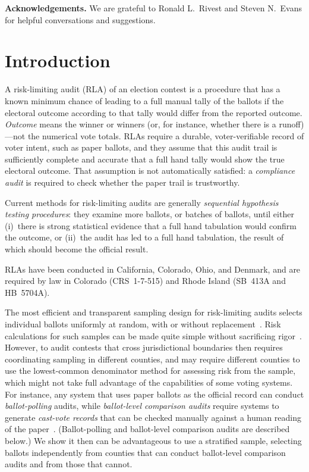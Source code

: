 \documentclass[runningheads]{llncs}
\begin{document}
\noindent
\textbf{Acknowledgements.}
We are grateful to Ronald L.~Rivest and Steven N.~Evans for helpful conversations and suggestions.

\section{Introduction}
A risk-limiting audit (RLA) of an election contest is a procedure that
has a known minimum chance of leading to a full manual tally of the ballots if the electoral outcome  according to that tally would differ from the reported outcome.
\emph{Outcome} means the winner or winners (or, for instance, whether there is a runoff)---not the numerical vote totals. 
RLAs require a durable, voter-verifiable record of voter intent, such as paper ballots,
and they assume that this audit trail is sufficiently complete and accurate that a full hand
tally would show the true electoral outcome.
That assumption is not automatically satisfied: a \emph{compliance audit}
\cite{starkWagner12} 
is required to check whether the paper trail is trustworthy.

Current methods for risk-limiting audits are generally \emph{sequential hypothesis testing procedures}: they examine more ballots, or batches of ballots,
until either (i)~there is strong statistical evidence that a full hand tabulation would confirm the outcome,
or (ii)~the audit has led to a full hand tabulation, the result of which should become the official
result.

RLAs have been conducted in California, Colorado, Ohio, and Denmark, and are required by law in Colorado (CRS~1-7-515) and Rhode Island (SB~413A and HB~5704A).

The most efficient and transparent sampling design for risk-limiting audits selects individual ballots uniformly at random, with or without replacement~\cite{stark10c}.
Risk calculations for such samples can be made quite simple without sacrificing rigor~\cite{stark10d,lindemanStark12}.
However, to audit contests that cross jurisdictional boundaries then requires coordinating sampling in different counties, and may require different counties to use the lowest-common denominator method for assessing risk from the sample, which might not take full advantage of the capabilities of some voting systems. 
For instance, any system that uses paper ballots as the official record can conduct \emph{ballot-polling} audits, while \emph{ballot-level comparison audits} require systems to generate \emph{cast-vote records} that can be checked manually against a human reading of the paper~\cite{lindemanEtal12,lindemanStark12}. 
(Ballot-polling and ballot-level comparison audits are described below.) 
We show it then can be advantageous to use a stratified sample, selecting ballots independently from counties that can conduct ballot-level comparison audits and from those that cannot.  
\end{document}
